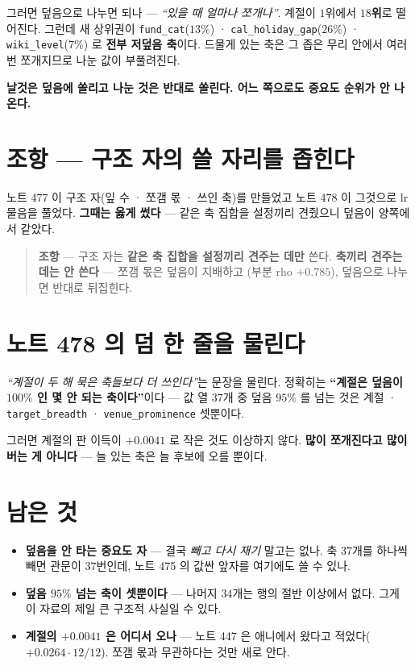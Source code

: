 \documentclass[11pt]{article}
\begin{document}
그러면 덮음으로 나누면 되나 --- \emph{``있을 때 얼마나 쪼개나''}. 계절이
$1$위에서 \textbf{$18$위}로 떨어진다. 그런데 새 상위권이
\texttt{fund\_cat}($13\%$) · \texttt{cal\_holiday\_gap}($26\%$) ·
\texttt{wiki\_level}($7\%$) 로 \textbf{전부 저덮음 축}이다. 드물게
있는 축은 그 좁은 무리 안에서 여러 번 쪼개지므로 나눈 값이 부풀려진다.

\textbf{날것은 덮음에 쏠리고 나눈 것은 반대로 쏠린다. 어느 쪽으로도
중요도 순위가 안 나온다.}

\section*{조항 --- 구조 자의 쓸 자리를 좁힌다}

노트 477 이 구조 자(잎 수 · 쪼갬 몫 · 쓰인 축)를 만들었고 노트 478 이
그것으로 lr 물음을 풀었다. \textbf{그때는 옳게 썼다} --- 같은 축 집합을
설정끼리 견줬으니 덮음이 양쪽에서 같았다.

\begin{quote}
\textbf{조항} --- 구조 자는 \textbf{같은 축 집합을 설정끼리 견주는 데만}
쓴다. \textbf{축끼리 견주는 데는 안 쓴다} --- 쪼갬 몫은 덮음이 지배하고
(부분 rho $+0.785$), 덮음으로 나누면 반대로 뒤집힌다.
\end{quote}

\section{노트 478 의 덤 한 줄을 물린다}

\emph{``계절이 두 해 묵은 축들보다 더 쓰인다''}는 문장을 물린다. 정확히는
\textbf{``계절은 덮음이 $100\%$ 인 몇 안 되는 축이다''}이다 --- 값 열
$37$개 중 덮음 $95\%$ 를 넘는 것은 계절 · \texttt{target\_breadth} ·
\texttt{venue\_prominence} 셋뿐이다.

그러면 계절의 판 이득이 $+0.0041$ 로 작은 것도 이상하지 않다.
\textbf{많이 쪼개진다고 많이 버는 게 아니다} --- 늘 있는 축은 늘
후보에 오를 뿐이다.

\section*{남은 것}

\begin{itemize}
\item \textbf{덮음을 안 타는 중요도 자} --- 결국 \emph{빼고 다시 재기}
말고는 없나. 축 $37$개를 하나씩 빼면 관문이 $37$번인데, 노트 475 의
값싼 앞자를 여기에도 쓸 수 있나.
\item \textbf{덮음 $95\%$ 넘는 축이 셋뿐이다} --- 나머지 $34$개는
행의 절반 이상에서 없다. 그게 이 자료의 제일 큰 구조적 사실일 수 있다.
\item \textbf{계절의 $+0.0041$ 은 어디서 오나} --- 노트 447 은 애니에서
왔다고 적었다($+0.0264 \cdot 12/12$). 쪼갬 몫과 무관하다는 것만 새로
안다.
\end{itemize}
\end{document}

